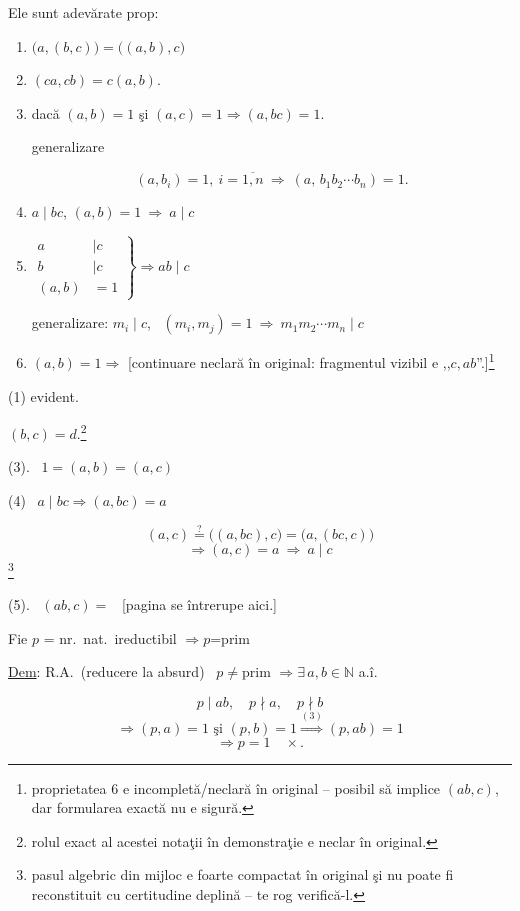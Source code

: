 \documentclass[12pt]{article}
\begin{document}
\noindent Ele sunt adevărate prop:

\begin{enumerate}
\item[1.] $\big(a,(b,c)\big) = \big((a,b),c\big)$
\item[2.] $(ca,cb) = c(a,b)$.
\item[3.] dacă $(a,b)=1$ şi $(a,c)=1 \Rightarrow (a,bc)=1$.

\noindent generalizare

\[
(a,b_i)=1,\ i=\overline{1,n} \ \Rightarrow \ (a,\,b_1b_2\cdots b_n)=1.
\]

\item[4.] $a\mid bc$, $(a,b)=1 \ \Rightarrow \ a\mid c$

\item[5.] $\left.\begin{aligned} a&\mid c\\ b&\mid c\\ (a,b)&=1\end{aligned}\right\} \Rightarrow ab\mid c$

\noindent generalizare: \quad $m_i\mid c$, \ $(m_i,m_j)=1 \ \Rightarrow \ m_1m_2\cdots m_n\mid c$

\item[6.] $(a,b)=1 \Rightarrow$ [continuare neclară în original: fragmentul vizibil e ,,$c,ab$''.]\footnote{proprietatea 6 e incompletă/neclară în original -- posibil să implice $(ab,c)$, dar formularea exactă nu e sigură.}
\end{enumerate}

\bigskip
\noindent (1) evident.

\noindent $(b,c)=d$.\footnote{rolul exact al acestei notaţii în demonstraţie e neclar în original.}

\bigskip
\noindent (3). \ $1=(a,b)=(a,c)$

\bigskip
\noindent (4) \ $a\mid bc \Rightarrow (a,bc)=a$

\[
(a,c) \overset{?}{=} \big((a,bc),c\big) = \big(a,(bc,c)\big)
\]
\[
\Rightarrow (a,c)=a \ \Rightarrow \ a\mid c
\]
\noindent\footnote{pasul algebric din mijloc e foarte compactat în original şi nu poate fi reconstituit cu certitudine deplină -- te rog verifică-l.}

\bigskip
\noindent (5). \ $(ab,c)=$ \ [pagina se întrerupe aici.]

\bigskip
\noindent Fie $p$ = nr.\ nat.\ ireductibil $\Rightarrow p$=prim

\noindent\underline{Dem}: R.A.\ (reducere la absurd) \ $p\neq$prim $\Rightarrow \exists\,a,b\in\mathbb{N}$ a.î.

\[
p\mid ab,\quad p\nmid a,\quad p\nmid b
\]
\[
\Rightarrow (p,a)=1 \text{ şi } (p,b)=1 \overset{(3)}{\Longrightarrow} (p,ab)=1
\]
\[
\Rightarrow p=1 \quad \times.
\]
\end{document}
